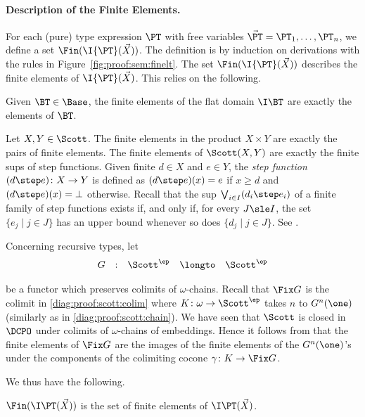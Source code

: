 \paragraph{Description of the Finite Elements.}
For each (pure) type expression $\PT$
with free variables $\vec\PT = \PT_1,\dots,\PT_n$,
we define a set $\Fin(\I{\PT}(\vec X))$.
The definition is by induction on derivations with
the rules in Figure~\ref{fig:proof:sem:finelt}.
The set $\Fin(\I{\PT}(\vec X))$
describes the finite elements of $\I{\PT}(\vec X)$.
This relies on the following.

Given $\BT \in \Base$,
the finite elements of the flat domain $\I\BT$
are exactly the elements of $\BT$.

Let $X,Y \in \Scott$.
The finite elements in the product $X \times Y$
are exactly the pairs of finite elements.
The finite elements of $\Scott(X,Y)$ are exactly the finite sups of step functions.
Given finite $d \in X$ and $e \in Y$,
the \emph{step function} $(d \step e) \colon X \to Y$
is defined as $(d \step e)(x) = e$ if $x \geq d$ and
$(d \step e)(x)= \bot$ otherwise.
Recall that the sup $\bigvee_{i \in I}(d_i \step e_i)$ of 
a finite family of step functions exists
if, and only if,
for every $J \sle I$, the set $\{e_j \mid j \in J\}$ has an upper bound
whenever so does $\{d_j \mid j \in J\}$.
See \cite[Theorem 1.4.12]{ac98book}.


Concerning recursive types, let 
\[
\begin{array}{*{5}{l}}
  G
& :
& \Scott^\ep
& \longto
& \Scott^\ep
\end{array}
\]

\noindent
be a functor which preserves colimits of $\omega$-chains.
Recall that $\Fix G$ is the colimit in \eqref{diag:proof:scott:colim}
where $K \colon \omega \to \Scott^\ep$
takes $n$ to $G^n(\one)$
(similarly as in \eqref{diag:proof:scott:chain}).
We have seen that $\Scott$ is closed in $\DCPO$
under colimits of $\omega$-chains of embeddings.
Hence it follows from \cite[Theorem 3.3.11]{aj95chapter}
that the finite elements of $\Fix G$
are the images of the finite elements of the $G^n(\one)$'s
under the components of the colimiting cocone
$\gamma \colon K \to \Fix G$.

We thus have the following.

\begin{proposition}
\label{prop:proof:scott:fin}
$\Fin(\I\PT(\vec X))$ is the set of finite elements of $\I\PT(\vec X)$.
\end{proposition}





